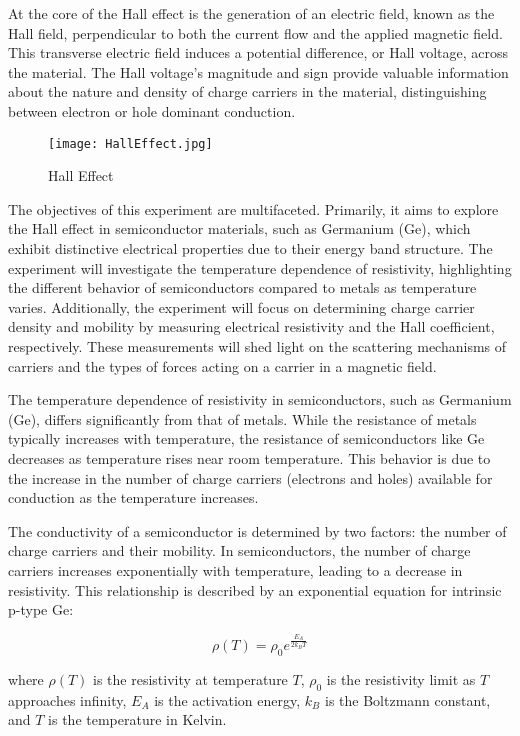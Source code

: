\documentclass[11pt]{article}
\begin{document}
	At the core of the Hall effect is the generation of an electric field, known as the Hall field, perpendicular to both the current flow and the applied magnetic field. This transverse electric field induces a potential difference, or Hall voltage, across the material. The Hall voltage's magnitude and sign provide valuable information about the nature and density of charge carriers in the material, distinguishing between electron or hole dominant conduction.
	
	\begin{figure}[htbp]
		\centering
		\caption{Hall Effect}
		\texttt{[image: HallEffect.jpg]}
	\end{figure}
	
	The objectives of this experiment are multifaceted. Primarily, it aims to explore the Hall effect in semiconductor materials, such as Germanium (Ge), which exhibit distinctive electrical properties due to their energy band structure. The experiment will investigate the temperature dependence of resistivity, highlighting the different behavior of semiconductors compared to metals as temperature varies. Additionally, the experiment will focus on determining charge carrier density and mobility by measuring electrical resistivity and the Hall coefficient, respectively. These measurements will shed light on the scattering mechanisms of carriers and the types of forces acting on a carrier in a magnetic field.
	
	The temperature dependence of resistivity in semiconductors, such as Germanium (Ge), differs significantly from that of metals. While the resistance of metals typically increases with temperature, the resistance of semiconductors like Ge decreases as temperature rises near room temperature. This behavior is due to the increase in the number of charge carriers (electrons and holes) available for conduction as the temperature increases.
	
	The conductivity of a semiconductor is determined by two factors: the number of charge carriers and their mobility. In semiconductors, the number of charge carriers increases exponentially with temperature, leading to a decrease in resistivity. This relationship is described by an exponential equation for intrinsic p-type Ge:
	
	\begin{equation}
		\rho(T) = \rho_0 e^{\frac{E_A}{2k_B T}} \label{eq:1}
	\end{equation}
	
	where \( \rho(T) \) is the resistivity at temperature \( T \), \( \rho_0 \) is the resistivity limit as \( T \) approaches infinity, \( E_A \) is the activation energy, \( k_B \) is the Boltzmann constant, and \( T \) is the temperature in Kelvin.
	
\end{document}
